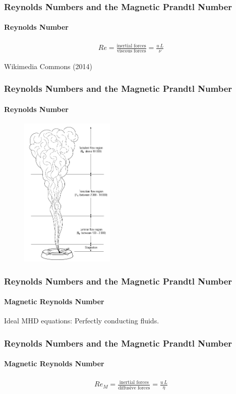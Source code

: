 \documentclass{beamer}
\begin{document}
\begin{frame}
 \frametitle{Reynolds Numbers and the Magnetic Prandtl Number}
 \framesubtitle{Reynolds Number}
 
 \begin{align}
  Re = \frac{\text{inertial forces}}{\text{viscous forces}} =  \frac{u\,L}{\nu} \nonumber
 \end{align}
 
 

 
  Wikimedia Commons (2014)
\end{frame}

\begin{frame}
 \frametitle{Reynolds Numbers and the Magnetic Prandtl Number}
 \framesubtitle{Reynolds Number}
 
  \begin{figure}[t]
  \includegraphics[width=4.5cm]{img/reynolds_smoke}
  \label{Fig:4}
  \centering
 \end{figure}
\end{frame}


\begin{frame}
 \frametitle{Reynolds Numbers and the Magnetic Prandtl Number}
 \framesubtitle{Magnetic Reynolds Number}
 
 Ideal MHD equations: Perfectly conducting fluids. 
 
\end{frame}

\begin{frame}
 \frametitle{Reynolds Numbers and the Magnetic Prandtl Number}
 \framesubtitle{Magnetic Reynolds Number}
 
  \begin{align}
  Re_M = \frac{\text{inertial forces}}{\text{diffusive forces}} =  \frac{u\,L}{\eta} \nonumber
 \end{align}
 
\end{frame}
\end{document}
